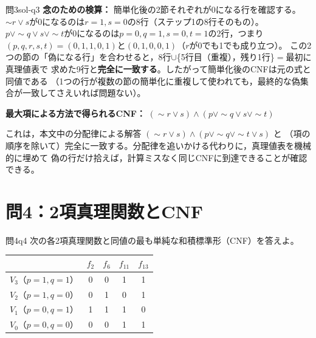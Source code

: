 \documentclass[autodetect-engine,dvi=dvipdfmx,ja=standard]{bxjsarticle}
\begin{document}
\begin{solution}{問3}{sol-q3}
\textbf{念のための検算：} 簡単化後の2節それぞれが\(0\)になる行を確認する。
\(\sim r\lor s\)が\(0\)になるのは\(r=1,s=0\)の8行（ステップ1の8行そのもの）。
\(p\lor\sim q\lor s\lor\sim t\)が\(0\)になるのは\(p=0,q=1,s=0,t=1\)の2行，つまり
\((p,q,r,s,t)=(0,1,1,0,1)\)と\((0,1,0,0,1)\)（\(r\)が0でも1でも成り立つ）。
この2つの節の「偽になる行」を合わせると，8行\(\cup\)\{5行目（重複），残り1行\}\(=\)最初に真理値表で
求めた9行と\textbf{完全に一致する}。したがって簡単化後のCNFは元の式と同値である
（1つの行が複数の節の簡単化に重複して使われても，最終的な偽集合が一致してさえいれば問題ない）。

\textbf{最大項による方法で得られるCNF：} \((\sim r\lor s)\land(p\lor\sim q\lor s\lor\sim t)\)

これは，本文中の分配律による解答 \((\sim r\lor s)\land(p\lor\sim q\lor\sim t\lor s)\) と
（項の順序を除いて）完全に一致する。分配律を追いかける代わりに，真理値表を機械的に埋めて
偽の行だけ拾えば，計算ミスなく同じCNFに到達できることが確認できる。
\end{solution}

\section{問4：2項真理関数とCNF}

\begin{exercise}{問4}{q4}
次の各2項真理関数と同値の最も単純な和積標準形（CNF）を答えよ。
\begin{center}
\begin{tabular}{c|cccc}
\toprule
 & \(f_2\) & \(f_6\) & \(f_{11}\) & \(f_{13}\) \\
\midrule
\(V_3\)（\(p{=}1,q{=}1\)） & 0 & 0 & 1 & 1 \\
\(V_2\)（\(p{=}1,q{=}0\)） & 0 & 1 & 0 & 1 \\
\(V_1\)（\(p{=}0,q{=}1\)） & 1 & 1 & 1 & 0 \\
\(V_0\)（\(p{=}0,q{=}0\)） & 0 & 0 & 1 & 1 \\
\bottomrule
\end{tabular}
\end{center}
\end{exercise}
\end{document}
